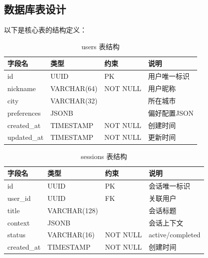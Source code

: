 \documentclass[12pt,a4paper]{ctexart}
\begin{document}
\subsection{数据库表设计}

以下是核心表的结构定义：

\begin{table}[H]
\centering
\caption{users 表结构}
\label{tab:users-table}
\renewcommand{\arraystretch}{1.2}
{\small
\begin{tabular}{p{3.5cm} p{3cm} p{1.5cm} p{4cm}}
\toprule
\textbf{字段名} & \textbf{类型} & \textbf{约束} & \textbf{说明} \\
\midrule
id & UUID & PK & 用户唯一标识 \\
nickname & VARCHAR(64) & NOT NULL & 用户昵称 \\
city & VARCHAR(32) & & 所在城市 \\
preferences & JSONB & & 偏好配置JSON \\
created\_at & TIMESTAMP & NOT NULL & 创建时间 \\
updated\_at & TIMESTAMP & NOT NULL & 更新时间 \\
\bottomrule
\end{tabular}
}
\end{table}

\begin{table}[H]
\centering
\caption{sessions 表结构}
\label{tab:sessions-table}
\renewcommand{\arraystretch}{1.2}
{\small
\begin{tabular}{p{3.5cm} p{3cm} p{1.5cm} p{4cm}}
\toprule
\textbf{字段名} & \textbf{类型} & \textbf{约束} & \textbf{说明} \\
\midrule
id & UUID & PK & 会话唯一标识 \\
user\_id & UUID & FK & 关联用户 \\
title & VARCHAR(128) & & 会话标题 \\
context & JSONB & & 会话上下文 \\
status & VARCHAR(16) & NOT NULL & active/completed \\
created\_at & TIMESTAMP & NOT NULL & 创建时间 \\
\bottomrule
\end{tabular}
}
\end{table}
\end{document}

